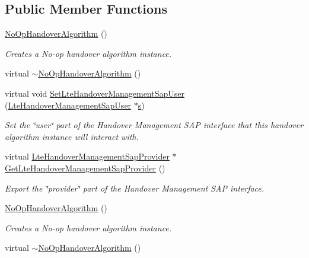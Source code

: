\subsection*{Public Member Functions}
\begin{DoxyCompactItemize}
\item 
\hyperlink{classns3_1_1NoOpHandoverAlgorithm_a80316b23d989c0115ace700b0adc0375}{No\+Op\+Handover\+Algorithm} ()
\begin{DoxyCompactList}\small\item\em Creates a No-\/op handover algorithm instance. \end{DoxyCompactList}\item 
virtual \hyperlink{classns3_1_1NoOpHandoverAlgorithm_a8e8480280c74265fb586c1da271eac01}{$\sim$\+No\+Op\+Handover\+Algorithm} ()
\item 
virtual void \hyperlink{classns3_1_1NoOpHandoverAlgorithm_a0d07ba908a911ec57e5b55ff8518cbe8}{Set\+Lte\+Handover\+Management\+Sap\+User} (\hyperlink{classns3_1_1LteHandoverManagementSapUser}{Lte\+Handover\+Management\+Sap\+User} $\ast$\hyperlink{generate__test__data__lte__sinr_8m_ad83eeb3a142285d1243a08c6b7026df8}{s})
\begin{DoxyCompactList}\small\item\em Set the \char`\"{}user\char`\"{} part of the Handover Management S\+AP interface that this handover algorithm instance will interact with. \end{DoxyCompactList}\item 
virtual \hyperlink{classns3_1_1LteHandoverManagementSapProvider}{Lte\+Handover\+Management\+Sap\+Provider} $\ast$ \hyperlink{classns3_1_1NoOpHandoverAlgorithm_a1a0a9cbc06ee042c11768d4767bc3062}{Get\+Lte\+Handover\+Management\+Sap\+Provider} ()
\begin{DoxyCompactList}\small\item\em Export the \char`\"{}provider\char`\"{} part of the Handover Management S\+AP interface. \end{DoxyCompactList}\item 
\hyperlink{classns3_1_1NoOpHandoverAlgorithm_a80316b23d989c0115ace700b0adc0375}{No\+Op\+Handover\+Algorithm} ()
\begin{DoxyCompactList}\small\item\em Creates a No-\/op handover algorithm instance. \end{DoxyCompactList}\item 
virtual \hyperlink{classns3_1_1NoOpHandoverAlgorithm_a22d2a60b289703da3c10b9a20aaacd97}{$\sim$\+No\+Op\+Handover\+Algorithm} ()

\end{DoxyCompactItemize}
